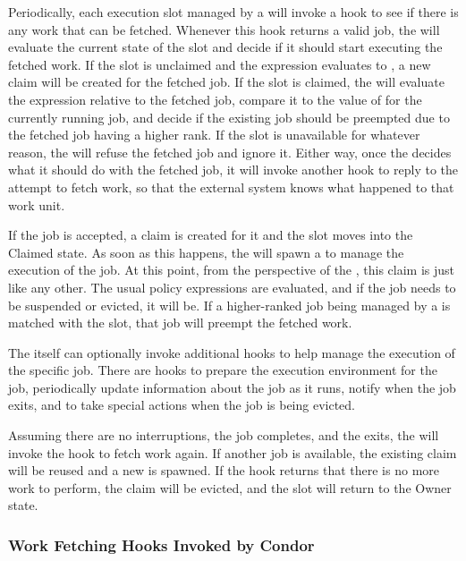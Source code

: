 Periodically, each execution slot managed by a  will
invoke a hook to see if there is any work that can be fetched.
Whenever this hook returns a valid job, the  will
evaluate the current state of the slot and decide if it should start
executing the fetched work.
If the slot is unclaimed and the  expression evaluates to
, a new claim will be created for the fetched job.
If the slot is claimed, the  will evaluate the
 expression relative to the fetched job, compare it to
the value of  for the currently running job, and decide
if the existing job should be preempted due to the fetched job having
a higher rank.
If the slot is unavailable for whatever reason, the 
will refuse the fetched job and ignore it.
Either way, once the  decides what it should do with
the fetched job, it will invoke another hook to reply to the attempt
to fetch work, so that the external system knows what happened to that
work unit.

If the job is accepted, a claim is created for it and the slot moves
into the Claimed state.
As soon as this happens, the  will spawn a
 to manage the execution of the job.
At this point, from the perspective of the , this claim
is just like any other.
The usual policy expressions are evaluated, and if the job needs to be
suspended or evicted, it will be.
If a higher-ranked job being managed by a  is matched
with the slot, that job will preempt the fetched work.

The  itself can optionally invoke additional hooks to
help manage the execution of the specific job.
There are hooks to prepare the execution environment for the job,
periodically update information about the job as it runs, notify when
the job exits, and to take special actions when the job is being evicted.

Assuming there are no interruptions, the job completes, and the
 exits, the  will invoke the hook to
fetch work again.
If another job is available, the existing claim will be reused and a
new  is spawned.
If the hook returns that there is no more work to perform, the claim
will be evicted, and the slot will return to the Owner state.


\subsubsection{\label{sec:job-hooks-hooks}
Work Fetching Hooks Invoked by Condor}

